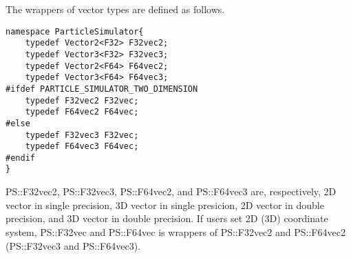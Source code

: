 The wrappers of vector types are defined as follows.
\begin{lstlisting}[caption=vectorwrapper]
namespace ParticleSimulator{
    typedef Vector2<F32> F32vec2;
    typedef Vector3<F32> F32vec3;
    typedef Vector2<F64> F64vec2;
    typedef Vector3<F64> F64vec3;
#ifdef PARTICLE_SIMULATOR_TWO_DIMENSION
    typedef F32vec2 F32vec;
    typedef F64vec2 F64vec;
#else
    typedef F32vec3 F32vec;
    typedef F64vec3 F64vec;
#endif
}
\end{lstlisting}

PS::F32vec2, PS::F32vec3, PS::F64vec2, and PS::F64vec3 are,
respectively, 2D vector in single precision, 3D vector in single
presicion, 2D vector in double precision, and 3D vector in double
precision. If users set 2D (3D) coordinate system, PS::F32vec and
PS::F64vec is wrappers of PS::F32vec2 and PS::F64vec2 (PS::F32vec3 and
PS::F64vec3).

